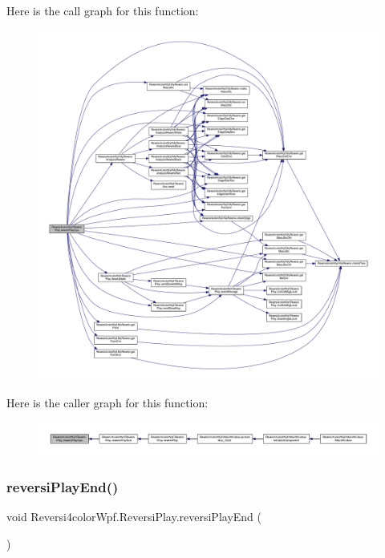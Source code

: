 Here is the call graph for this function\+:
\nopagebreak
\begin{figure}[H]
\begin{center}
\leavevmode
\includegraphics[width=350pt]{class_reversi4color_wpf_1_1_reversi_play_a2c7daaca43563e35abf8e65347c65a23_cgraph}
\end{center}
\end{figure}
Here is the caller graph for this function\+:
\nopagebreak
\begin{figure}[H]
\begin{center}
\leavevmode
\includegraphics[width=350pt]{class_reversi4color_wpf_1_1_reversi_play_a2c7daaca43563e35abf8e65347c65a23_icgraph}
\end{center}
\end{figure}
\mbox{\label{class_reversi4color_wpf_1_1_reversi_play_a870220856af57a48fc1527e59a552171}} 
\subsubsection{\texorpdfstring{reversi\+Play\+End()}{reversiPlayEnd()}}
{\footnotesize\ttfamily void Reversi4color\+Wpf.\+Reversi\+Play.\+reversi\+Play\+End (\begin{DoxyParamCaption}{ }\end{DoxyParamCaption})}



